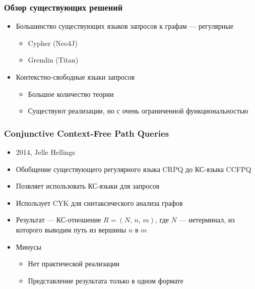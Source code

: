 \documentclass{beamer}
\begin{document}
\begin{frame}
  \transwipe[direction=90]
  \frametitle{Обзор существующих решений}
  \begin{itemize}
    \item Большинство существующих языков запросов к графам --- регулярные
    \begin{itemize}
        \item Cypher (Neo4J)
        \item Gremlin (Titan)
    \end{itemize}
    \item Контекстно-свободные языки запросов
    \begin{itemize}
        \item Большое количество теории
        \item Существуют реализации, но с очень ограниченной функциональностью
    \end{itemize}
  \end{itemize}
\end{frame}

\begin{frame}
  \transwipe[direction=90]
  \frametitle{Conjunctive Context-Free Path Queries}
  \begin{itemize}
    \item 2014, Jelle Hellings
    \item Обобщение существующего регулярного языка CRPQ до КС-языка CCFPQ
    \item Позвляет использовать КС-языки для запросов
    \item Использует CYK для синтаксического анализа графов
    \item Результат --- КС-отношение \(R = (N,\, n,\, m)\), где \(N\) --- нетерминал, из которого выводим путь из вершины \(n\) в \(m\)
  \end{itemize}
  
  \begin{itemize}
    \item Минусы
    \begin{itemize}
      \item Нет практической реализации
      \item Представление результата только в одном формате
    \end{itemize}
  \end{itemize}
\end{frame}
\end{document}
